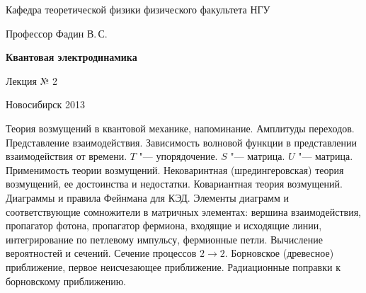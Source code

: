 \documentclass[12pt,pagesize,paper=landscape,paper=192mm:108mm]{scrbook}
\begin{document}
\begin{titlepage}
\begin{center}
    Кафедра теоретической физики физического факультета НГУ
    \medskip

    \Large
    Профессор Фадин В.\,С.
    \bigskip

    \huge
    \textbf{Квантовая электродинамика}
    \bigskip

    \Large
    Лекция № 2
    \vfill

    \normalsize
    \vfill


    \normalsize \ccbysa\hspace{0.5em}  Новосибирск 2013
  \end{center}
\end{titlepage}
\newpage

\vspace*{-1em}
\begin{center}
\vfill
  \begin{minipage}{0.65\linewidth}
    Теория возмущений в квантовой механике, напоминание. Амплитуды
    переходов.  Представление взаимодействия. Зависимость волновой
    функции в представлении взаимодействия от времени. $T$ "---
    упорядочение. $S$ "--- матрица. $U$ "--- матрица.  Применимость теории
    возмущений. Нековаринтная (шредингеровская) теория возмущений, ее
    достоинства и недостатки. Ковариантная теория
    возмущений. Диаграммы и правила Фейнмана для КЭД. Элементы
    диаграмм и соответствующие сомножители в матричных элементах:
    вершина взаимодействия, пропагатор фотона, пропагатор фермиона,
    входящие и исходящие линии, интегрирование по петлевому импульсу,
    фермионные петли. Вычисление вероятностей и сечений. Сечение
    процессов $2 \to 2$. Борновское (древесное) приближение, первое
    неисчезающее приближение. Радиационные поправки к борновскому
    приближению.
  \end{minipage}
  \vfill

\end{center}
\end{document}
